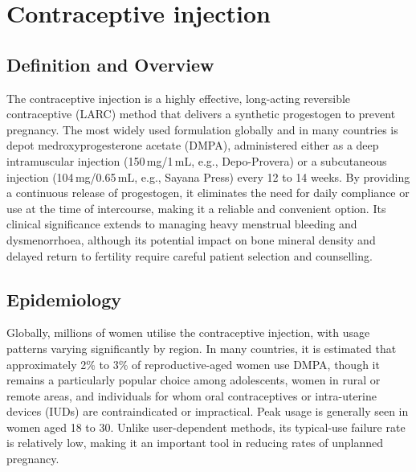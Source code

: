 \chapter{Contraceptive injection}

\section*{Definition and Overview}
The contraceptive injection is a highly effective, long-acting reversible contraceptive (LARC) method that delivers a synthetic progestogen to prevent pregnancy. The most widely used formulation globally and in many countries is depot medroxyprogesterone acetate (DMPA), administered either as a deep intramuscular injection (150\,mg/1\,mL, e.g., Depo-Provera) or a subcutaneous injection (104\,mg/0.65\,mL, e.g., Sayana Press) every 12 to 14 weeks. By providing a continuous release of progestogen, it eliminates the need for daily compliance or use at the time of intercourse, making it a reliable and convenient option. Its clinical significance extends to managing heavy menstrual bleeding and dysmenorrhoea, although its potential impact on bone mineral density and delayed return to fertility require careful patient selection and counselling.

\section*{Epidemiology}
Globally, millions of women utilise the contraceptive injection, with usage patterns varying significantly by region. In many countries, it is estimated that approximately 2\% to 3\% of reproductive-aged women use DMPA, though it remains a particularly popular choice among adolescents, women in rural or remote areas, and individuals for whom oral contraceptives or intra-uterine devices (IUDs) are contraindicated or impractical. Peak usage is generally seen in women aged 18 to 30. Unlike user-dependent methods, its typical-use failure rate is relatively low, making it an important tool in reducing rates of unplanned pregnancy.

